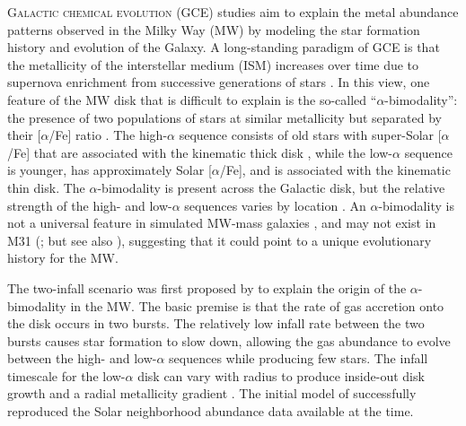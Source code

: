 \documentclass[twocolumn,twocolappendix,linenumbers]{aastex631}
\newcommand{\aFe}{[$\alpha$/Fe]\xspace}
\begin{document}
\lettrine{G}{alactic chemical evolution} (GCE) studies aim to explain the metal abundance patterns observed in the Milky Way (MW) by modeling the star formation history and evolution of the Galaxy. A long-standing paradigm of GCE is that the metallicity of the interstellar medium (ISM) increases over time due to supernova enrichment from successive generations of stars \citep[e.g.,][]{tinsley_stellar_1979,matteucci_relative_1986}. In this view, one feature of the MW disk that is difficult to explain is the so-called ``$\alpha$-bimodality'': the presence of two populations of stars at similar metallicity but separated by their \aFe ratio \citep[e.g.,][]{bensby_exploring_2014}. The high-$\alpha$ sequence consists of old stars \citep[$\gtrsim9$ Gyr; e.g.,][]{pinsonneault_apokasc-3_2025} with super-Solar \aFe that are associated with the kinematic thick disk \citep[e.g.,][]{fuhrmann_nearby_1998}, while the low-$\alpha$ sequence is younger, has approximately Solar \aFe, and is associated with the kinematic thin disk. The $\alpha$-bimodality is present across the Galactic disk, but the relative strength of the high- and low-$\alpha$ sequences varies by location \citep{hayden_chemical_2015}. An $\alpha$-bimodality is not a universal feature in simulated MW-mass galaxies \citep[e.g.,][]{mackereth_origin_2018,parul_effect_2025}, and may not exist in M31 (\citealt{nidever_prevalence_2024}; but see also \citealt{kobayashi_fe_2023}), suggesting that it could point to a unique evolutionary history for the MW.


The two-infall scenario was first proposed by \citet{chiappini_chemical_1997} to explain the origin of the $\alpha$-bimodality in the MW. The basic premise is that the rate of gas accretion onto the disk occurs in two bursts. The relatively low infall rate between the two bursts causes star formation to slow down, allowing the gas abundance to evolve between the high- and low-$\alpha$ sequences while producing few stars. 
The infall timescale for the low-$\alpha$ disk can vary with radius to produce inside-out disk growth and a radial metallicity gradient \citep{romano_mass_2000}.
The initial model of \citet{chiappini_chemical_1997} successfully reproduced the Solar neighborhood abundance data available at the time.
\end{document}
